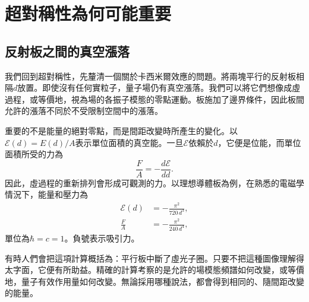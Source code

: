 \chapter{超對稱性為何可能重要}


\section{反射板之間的真空漲落}

我們回到超對稱性，先釐清一個關於卡西米爾效應的問題。將兩塊平行的反射板相隔\(d\)放置。即使沒有任何實粒子，量子場仍有真空漲落。我們可以將它們想像成虛過程，或等價地，視為場的各振子模態的零點運動。板施加了邊界條件，因此板間允許的漲落不同於不受限制空間中的漲落。

重要的不是能量的絕對零點，而是間距改變時所產生的變化。以\(\mathcal E(d)=E(d)/A\)表示單位面積的真空能。一旦\(\mathcal E\)依賴於\(d\)，它便是位能，而單位面積所受的力為
\begin{equation}
\frac{F}{A}=-\frac{d\mathcal E}{dd}.
\end{equation}
因此，虛過程的重新排列會形成可觀測的力。以理想導體板為例，在熟悉的電磁學情況下，能量和壓力為
\begin{align}
\mathcal E(d)&=-\frac{\pi^2}{720\,d^3},\\
\frac{F}{A}&=-\frac{\pi^2}{240\,d^4},
\end{align}
單位為\(\hbar=c=1\)。負號表示吸引力。

\begin{classroomqa}
\end{classroomqa}

有時人們會把這項計算概括為：平行板中斷了虛光子圈。只要不把這種圖像理解得太字面，它便有所助益。精確的計算考察的是允許的場模態頻譜如何改變，或等價地，量子有效作用量如何改變。無論採用哪種說法，都會得到相同的、隨間距改變的能量。

